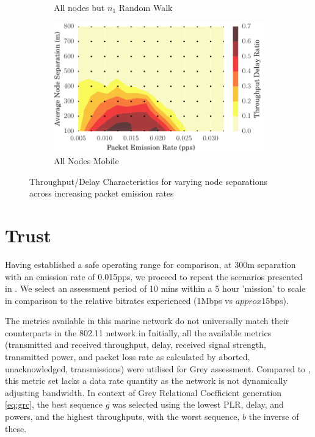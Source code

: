 \documentclass[runningheads,a4paper]{llncs}
\begin{document}
\begin{figure}
\begin{subfigure}{.5\textwidth}
  \caption{All nodes but $n_1$ Random Walk}
  \label{fig:2d_throughput_allbut1}
\end{subfigure}
\begin{subfigure}{.5\textwidth}
\centering
  \includegraphics[width=.9\linewidth]{img/2d_ratio_all_mobile.pdf}
  \caption{All Nodes Mobile}
  \label{fig:2d_throughput_all_mobile}
\end{subfigure}
\caption{Throughput/Delay Characteristics for varying node separations across increasing packet emission rates}
\label{fig:scenario_throughputratios_2d}
\end{figure}


\section{Trust}\label{sec:trustresultsanddiscussion}

Having established a safe operating range for comparison, at 300m separation with an emission rate of 0.015pps, we proceed to repeat the scenarios presented in \cite{Guo11}. We select an assessment period of 10 mins within a 5 hour 'mission' to scale in comparison to the relative bitrates experienced (1Mbps vs $approx15$bps).

The metrics available in this marine network do not universally match their counterparts in the 802.11 network in \cite{Guo11}
Initially, all the available metrics (transmitted and received throughput, delay, received signal strength, transmitted power, and packet loss rate as calculated by aborted, unacknowledged, transmissions) were utilised for Grey assessment. 
Compared to \cite{Guo11}, this metric set lacks a data rate quantity as the network is not dynamically adjusting bandwidth.
In context of Grey Relational Coefficient generation \eqref{eq:grc}, the best sequence $g$ was selected using the lowest PLR, delay, and powers, and the highest throughputs, with the worst sequence, $b$ the inverse of these.
\end{document}
